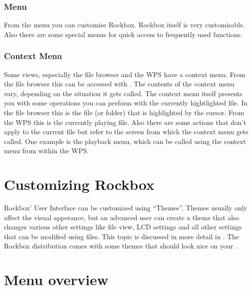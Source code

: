 \subsubsection{Menu}
From the menu you can customise Rockbox. Rockbox itself is very customisable.
Also there are some special menus for quick access to frequently used
functions.

\subsubsection{Context Menu}
Some views, especially the file browser and the WPS have a context menu.
From the file browser this can be accessed with \ActionStdContext{}.
The contents of the context menu vary, depending on the situation it gets
called. The context menu itself presents you with some operations you can
perform with the currently hightlighted file. In the file browser this is
the file (or folder) that is highlighted by the cursor. From the WPS this is
the currently playing file. Also there are some actions that don't apply
to the current file but refer to the screen from which the context menu
gets called. One example is the playback menu, which can be called using
the context menu from within the WPS.

\section{Customizing Rockbox}
Rockbox' User Interface can be customized using ``Themes''. Themes usually
only affect the visual apperance, but an advanced user can create a theme
that also changes various other settings like file view, LCD settings and
all other settings that can be modified using  files. This topic
is discussed in more detail in .
The Rockbox distribution comes with some themes that should look nice on
your \dap{}. 

\section{Menu overview}
%

